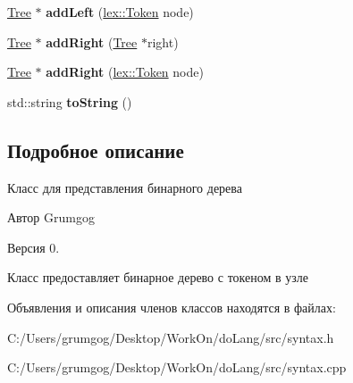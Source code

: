 \begin{DoxyCompactItemize}
\mbox{\hyperlink{classsyntax_1_1_tree}{Tree}} $\ast$ {\bfseries add\+Left} (\mbox{\hyperlink{classlex_1_1_token}{lex\+::\+Token}} node)
\item 
\mbox{\label{classsyntax_1_1_tree_a816bfeade478794502b07c769e4de123}} 
\mbox{\hyperlink{classsyntax_1_1_tree}{Tree}} $\ast$ {\bfseries add\+Right} (\mbox{\hyperlink{classsyntax_1_1_tree}{Tree}} $\ast$right)
\item 
\mbox{\label{classsyntax_1_1_tree_afd15957ab72cd61502f83f1274546df9}} 
\mbox{\hyperlink{classsyntax_1_1_tree}{Tree}} $\ast$ {\bfseries add\+Right} (\mbox{\hyperlink{classlex_1_1_token}{lex\+::\+Token}} node)
\item 
\mbox{\label{classsyntax_1_1_tree_a42882c4ee2c5eebead2adb74d6c36ece}} 
std\+::string {\bfseries to\+String} ()
\end{DoxyCompactItemize}


\subsection{Подробное описание}
Класс для представления бинарного дерева 

\begin{DoxyAuthor}{Автор}
Grumgog 
\end{DoxyAuthor}
\begin{DoxyVersion}{Версия}
0.
\end{DoxyVersion}
Класс предоставляет бинарное дерево с токеном в узле 

Объявления и описания членов классов находятся в файлах\+:\begin{DoxyCompactItemize}
\item 
C\+:/\+Users/grumgog/\+Desktop/\+Work\+On/do\+Lang/src/syntax.\+h\item 
C\+:/\+Users/grumgog/\+Desktop/\+Work\+On/do\+Lang/src/syntax.\+cpp\end{DoxyCompactItemize}
